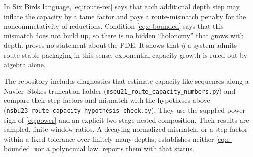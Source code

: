 In Six Birds language, \eqref{eq:route-rec} says that each additional depth step may inflate the
capacity by a tame factor and pays a route-mismatch penalty for the noncommutativity of
reductions. Condition \eqref{eq:e-bounded} says that this mismatch does not build up, so there is
no hidden ``holonomy'' that grows with depth.  proves no statement about
the PDE. It shows that \emph{if} a system admits route-stable packaging in this sense, exponential
capacity growth is ruled out by algebra alone.

The repository includes diagnostics that estimate capacity-like sequences along a Navier--Stokes
truncation ladder (\nolinkurl{nsbu21_route_capacity_numbers.py}) and compare their step factors
and mismatch with the hypotheses above (\nolinkurl{nsbu23_route_capacity_hypothesis_check.py}).
They use the supplied-power sign of \eqref{eq:power} and an explicit two-stage nested composition.
Their results are sampled, finite-window ratios. A decaying normalized mismatch, or a step factor
within a fixed tolerance over finitely many depths, establishes neither \eqref{eq:e-bounded} nor a
polynomial law.  reports them with that status.
